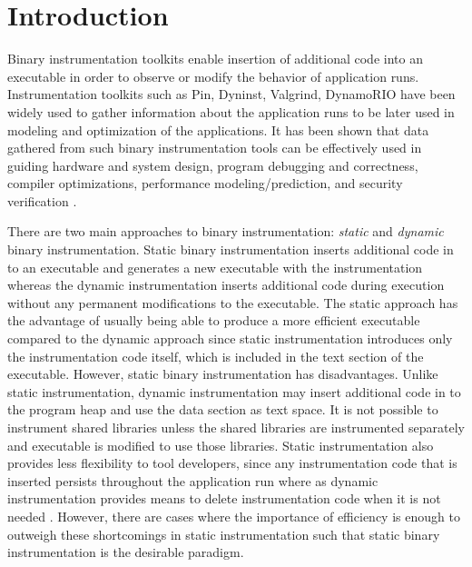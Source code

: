 \section{Introduction}

Binary instrumentation toolkits enable insertion of additional code into an
executable in order to observe or modify the behavior of application runs. 
Instrumentation toolkits such as Pin\cite{luk2005pin}, Dyninst\cite{buck2000api}, 
Valgrind\cite{nethercote2007valgrind}, DynamoRIO\cite{bruening2004efficient} have been widely used to gather information about the
application runs to be later used in modeling and optimization
of the applications. It has been shown that data gathered 
from such binary instrumentation tools can be effectively used in guiding hardware and
system design, program debugging and correctness, compiler optimizations,
performance modeling/prediction, and security verification \cite{snavely2001modeling}.

There are two main approaches to binary instrumentation: \textit{static} 
and \textit{dynamic} binary instrumentation. Static binary
instrumentation inserts additional code in to an executable and generates a new
executable with the instrumentation whereas the dynamic instrumentation inserts additional code 
during execution without any permanent modifications to the executable.
The static approach has the advantage of usually being able to produce
a more efficient executable compared to the dynamic approach
since static instrumentation introduces only the instrumentation code itself, 
which is included in the text section of the executable. However, static binary instrumentation has disadvantages. 
Unlike static instrumentation, dynamic
instrumentation may insert additional code in to the program heap and use the data section as text space.
It is not possible to instrument shared libraries 
unless the shared libraries are instrumented separately and executable is modified to use those libraries. 
Static instrumentation also provides less flexibility to tool developers, since any instrumentation code that is
inserted persists throughout the application run where as dynamic instrumentation 
provides means to delete instrumentation code when it is not needed \cite{tikir2002efficient}.
However, there are cases where the importance of efficiency is enough to outweigh
these shortcomings in static instrumentation \cite{carrington2006performance} such that static binary instrumentation is the
desirable paradigm.

